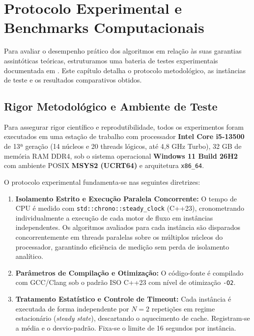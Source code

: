 \chapter{Protocolo Experimental e Benchmarks Computacionais}\label{sec:benchmarks}

Para avaliar o desempenho prático dos algoritmos em relação às suas garantias assintóticas teóricas, estruturamos uma bateria de testes experimentais documentada em . Este capítulo detalha o protocolo metodológico, as instâncias de teste e os resultados comparativos obtidos.


\section{Rigor Metodológico e Ambiente de Teste}\label{sec:bench_metodologia}

Para assegurar rigor científico e reprodutibilidade, todos os experimentos foram executados em uma estação de trabalho com processador \textbf{Intel Core i5-13500} de 13ª geração (14 núcleos e 20 threads lógicos, até 4,8 GHz Turbo), 32 GB de memória RAM DDR4, sob o sistema operacional \textbf{Windows 11 Build 26H2} com ambiente POSIX \textbf{MSYS2 (UCRT64)} e arquitetura \texttt{x86\_64}.

O protocolo experimental fundamenta-se nas seguintes diretrizes:

\begin{enumerate}
    \item \textbf{Isolamento Estrito e Execução Paralela Concorrente:} O tempo de CPU é medido com \lstinline{std::chrono::steady_clock} (C++23), cronometrando individualmente a execução de cada motor de fluxo em instâncias independentes. Os algoritmos avaliados para cada instância são disparados concorrentemente em threads paralelas sobre os múltiplos núcleos do processador, garantindo eficiência de medição sem perda de isolamento analítico.
    \item \textbf{Parâmetros de Compilação e Otimização:} O código-fonte é compilado com GCC/Clang sob o padrão ISO C++23 com nível de otimização \lstinline{-O2}.
    \item \textbf{Tratamento Estatístico e Controle de Timeout:} Cada instância é executada de forma independente por $N = 2$ repetições em regime estacionário (\textit{steady state}), descartando o aquecimento de cache. Registram-se a média e o desvio-padrão. Fixa-se o limite de 16 segundos por instância.
\end{enumerate}


